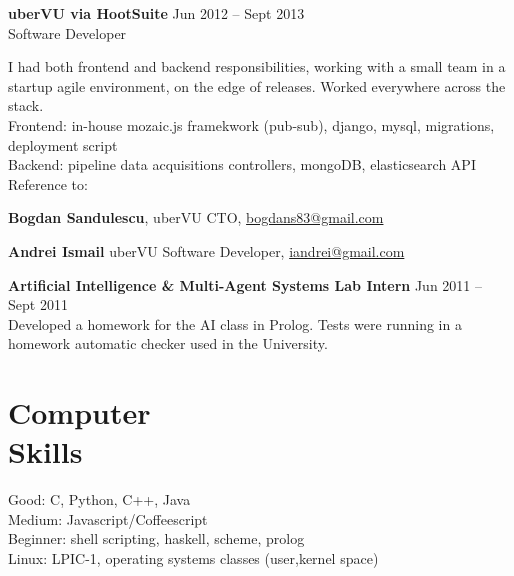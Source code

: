 \documentclass[margin,line]{resume}
\begin{document}
\begin{resume}
    \vspace{1.2mm}\textbf{uberVU via HootSuite}
        \hfill Jun 2012 -- Sept 2013\vspace{1mm}\\
        Software Developer\vspace{1.2mm}\\
    {\fontsize{2.65mm}{1em}\selectfont
      I had both frontend and backend responsibilities, working with a small team in a startup agile environment, on the edge of releases. Worked everywhere across the stack.\vspace{1.2mm}\\
      Frontend: in-house mozaic.js framekwork (pub-sub), django, mysql, migrations, deployment script\vspace{1.2mm}\\
      Backend: pipeline data acquisitions controllers, mongoDB, elasticsearch API\vspace{1.2mm}\\
      Reference to:
      \begin{list2}
          \item \textbf{Bogdan Sandulescu}, uberVU CTO, \href{mailto:bogdans83@gmail.com}{bogdans83@gmail.com}
          \item \textbf{Andrei Ismail} uberVU Software Developer, \href{mailto:iandrei@gmail.com}{iandrei@gmail.com}
      \end{list2}
    }

    \vspace{1.2mm}\textbf{Artificial Intelligence \& Multi-Agent Systems Lab Intern}
        \hfill Jun 2011 -- Sept 2011\vspace{1mm}\\
    {\fontsize{2.65mm}{1em}\selectfont
      Developed a homework for the AI class in Prolog. Tests were running in a homework automatic checker used in the University.
    }
    \section{\mysidestyle Computer\\Skills}

    Good: C, Python, C++, Java                            \\
    Medium: Javascript/Coffeescript  \\
    Beginner: shell scripting, haskell, scheme, prolog                    \\
    Linux: LPIC-1, operating systems classes (user,kernel space)


\end{resume}
\end{document}

